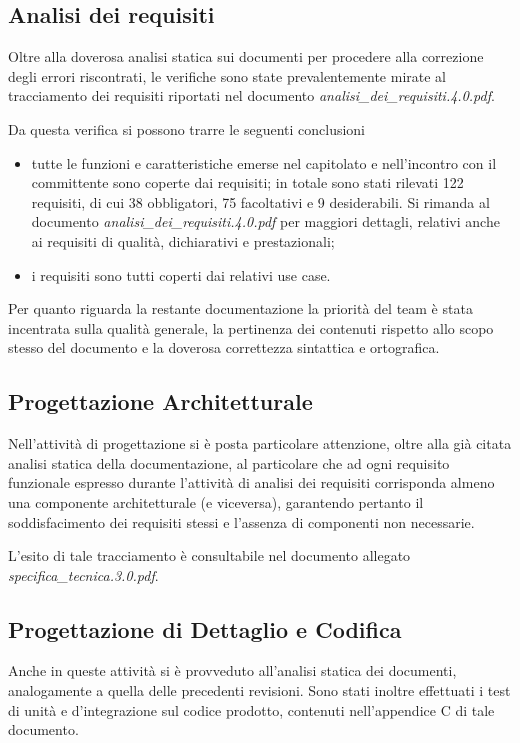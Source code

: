 \subsection{Analisi dei requisiti}
Oltre alla doverosa analisi statica sui documenti per procedere alla correzione degli errori riscontrati, le verifiche sono state prevalentemente mirate al tracciamento dei requisiti riportati nel documento \textit{analisi\_dei\_requisiti.4.0.pdf}.

Da questa verifica si possono trarre le seguenti conclusioni
\begin{itemize}
\item tutte le funzioni e caratteristiche emerse nel capitolato e nell'incontro con il committente sono coperte dai requisiti;
in totale sono stati rilevati 122 requisiti, di cui 38 obbligatori,  75 facoltativi e 9 desiderabili. Si rimanda al documento \textit{analisi\_dei\_requisiti.4.0.pdf} per maggiori dettagli, relativi anche ai requisiti di qualità, dichiarativi e prestazionali;

\item i requisiti sono tutti coperti dai relativi use case.
\end{itemize}

Per quanto riguarda la restante documentazione la priorità del team è stata incentrata sulla qualità generale, la pertinenza dei contenuti rispetto allo scopo stesso del documento e la doverosa correttezza sintattica e ortografica.

\subsection {Progettazione Architetturale}
Nell'attività di progettazione si è posta particolare attenzione, oltre alla già citata analisi statica della documentazione, al particolare che ad ogni requisito funzionale espresso durante l'attività di analisi dei requisiti corrisponda almeno una componente architetturale (e viceversa), garantendo pertanto il soddisfacimento dei requisiti stessi e l'assenza di componenti non necessarie.

L'esito di tale tracciamento è consultabile nel documento allegato \textit{specifica\_tecnica.3.0.pdf}.

\subsection {Progettazione di Dettaglio e Codifica}
Anche in queste attività si è provveduto all'analisi statica dei documenti, analogamente a quella delle precedenti revisioni.
Sono stati inoltre effettuati i test di unità e d'integrazione sul codice prodotto, contenuti nell'appendice C di tale documento.

